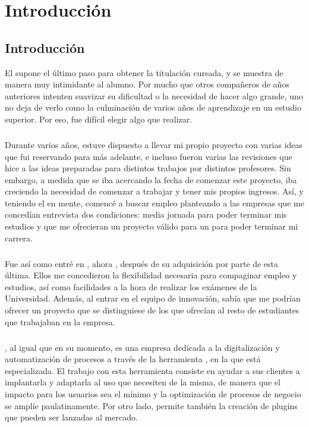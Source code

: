 \documentclass{subfiles}
\begin{document}
    \chapter{Introducción}
    \label{chap:introduccion}

        \section{Introducción}
        \label{sec:introduccion}

        {El \TFG supone el último paso para obtener la titulación cursada, y se muestra de manera muy intimidante al alumno. Por mucho que otros compañeros de años anteriores intenten suavizar su dificultad o la necesidad de hacer algo grande, uno no deja de verlo como la culminación de varios años de aprendizaje en un estudio superior. Por eso, fue difícil elegir algo que realizar.}
      
        \paragraph{}
        {Durante varios años, estuve dispuesto a llevar mi propio proyecto con varias ideas que fui reservando para más adelante, e incluso fueron varias las revisiones que hice a las ideas preparadas para distintos trabajos por distintos profesores. Sin embargo, a medida que se iba acercando la fecha de comenzar este proyecto, iba creciendo la necesidad de comenzar a trabajar y tener mis propios ingresos. Así, y teniendo el \TFG en mente, comencé a buscar empleo planteando a las empresas que me concedían entrevista dos condiciones: media jornada para poder terminar mis estudios y que me ofrecieran un proyecto válido para un \tfg para poder terminar mi carrera.}
      
        \paragraph{}
        {Fue así como entré en \silverstorm, ahora \thirdera, después de su adquisición por parte de esta última. Ellos me concedieron la flexibilidad necesaria para compaginar empleo y estudios, así como facilidades a la hora de realizar los exámenes de la Universidad. Además, al entrar en el equipo de innovación, sabía que me podrían ofrecer un proyecto que se distinguiese de los que ofrecían al resto de estudiantes que trabajaban en la empresa.}

        \paragraph{}
        {\thirdera, al igual que \silverstorm en su momento, es una empresa dedicada a la digitalización y automatización de procesos a través de la herramienta \servicenow, en la que está especializada. El trabajo con esta herramienta consiste en ayudar a sus clientes a implantarla y adaptarla al uso que necesiten de la misma, de manera que el impacto para los usuarios sea el mínimo y la optimización de procesos  de negocio se amplíe paulatinamente. Por otro lado, \servicenow permite también la creación de plugins que pueden ser lanzadas al mercado.}
\end{document}

